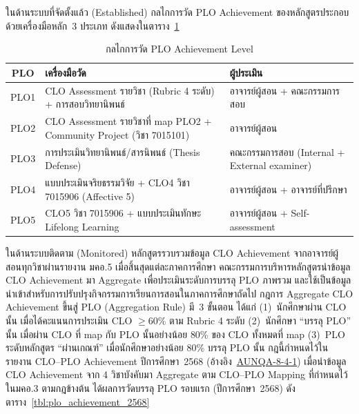 
ในด้านระบบที่จัดตั้งแล้ว (Established) กลไกการวัด PLO Achievement ของหลักสูตรประกอบด้วยเครื่องมือหลัก~3 ประเภท ดังแสดงในตาราง~\ref{tbl:plo_measurement}

\begin{table}[H]
  \centering
  \caption{กลไกการวัด PLO Achievement Level}
  \label{tbl:plo_measurement}
  \begingroup
  \footnotesize
  \setlength{\tabcolsep}{3pt}
  \renewcommand{\arraystretch}{1.2}
  \begin{tabularx}{\linewidth}{|c|>{\raggedright\arraybackslash}X|>{\raggedright\arraybackslash}X|}
    \hline
    \textbf{PLO} & \textbf{เครื่องมือวัด} & \textbf{ผู้ประเมิน} \\
    \hline
    PLO1 & CLO Assessment รายวิชา (Rubric 4 ระดับ) + การสอบวิทยานิพนธ์ & อาจารย์ผู้สอน + คณะกรรมการสอบ \\
    \hline
    PLO2 & CLO Assessment รายวิชาที่ map PLO2 + Community Project (วิชา 7015101) & อาจารย์ผู้สอน \\
    \hline
    PLO3 & การประเมินวิทยานิพนธ์/สารนิพนธ์ (Thesis Defense) & คณะกรรมการสอบ (Internal + External examiner) \\
    \hline
    PLO4 & แบบประเมินจริยธรรมวิจัย + CLO4 วิชา 7015906 (Affective 5) & อาจารย์ผู้สอน + อาจารย์ที่ปรึกษา \\
    \hline
    PLO5 & CLO5 วิชา 7015906 + แบบประเมินทักษะ Lifelong Learning & อาจารย์ผู้สอน + Self-assessment \\
    \hline
  \end{tabularx}
  \endgroup
\end{table}

ในด้านระบบติดตาม (Monitored) หลักสูตรรวบรวมข้อมูล CLO Achievement จากอาจารย์ผู้สอนทุกวิชาผ่านรายงาน มคอ.5 เมื่อสิ้นสุดแต่ละภาคการศึกษา คณะกรรมการบริหารหลักสูตรนำข้อมูล CLO Achievement มา Aggregate เพื่อประเมินระดับการบรรลุ PLO ภาพรวม และใช้เป็นข้อมูลนำเข้าสำหรับการปรับปรุงกิจกรรมการเรียนการสอนในภาคการศึกษาถัดไป กฎการ Aggregate CLO Achievement ขึ้นสู่ PLO (Aggregation Rule) มี~3 ขั้นตอน ได้แก่ (1)~นักศึกษาผ่าน CLO นั้น เมื่อได้คะแนนการประเมิน CLO $\geq$60\% ตาม Rubric 4 ระดับ (2)~นักศึกษา ``บรรลุ PLO'' นั้น เมื่อผ่าน CLO ที่ map กับ PLO นั้นอย่างน้อย 80\% ของ CLO ทั้งหมดที่ map (3)~PLO ระดับหลักสูตร ``ผ่านเกณฑ์'' เมื่อนักศึกษาอย่างน้อย 80\% บรรลุ PLO นั้น กฎนี้กำหนดไว้ในรายงาน CLO--PLO Achievement ปีการศึกษา~2568 (อ้างอิง~\hyperlink{ref:AUNQA-8-4-1}{AUNQA-8-4-1}) เมื่อนำข้อมูล CLO Achievement จาก 4 วิชาบังคับมา Aggregate ตาม CLO--PLO Mapping ที่กำหนดไว้ในมคอ.3 ตามกฎข้างต้น ได้ผลการวัดบรรลุ PLO รอบแรก (ปีการศึกษา~2568) ดังตาราง~\ref{tbl:plo_achievement_2568}

